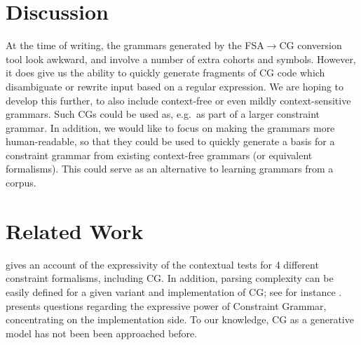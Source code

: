 \documentclass[11pt]{article}
\begin{document}
\section{Discussion}
At the time of writing, the grammars generated by the FSA$\rightarrow$CG
conversion tool look awkward, and involve a number of extra cohorts and symbols.
However, it does give us the ability to quickly generate fragments of CG code
which disambiguate or rewrite input based on a regular expression.
We are hoping to develop this further, to also include context-free or even
mildly context-sensitive grammars.
Such CGs could be used as, e.g.\ as part of a larger constraint grammar.
In addition, we would like to focus on making the grammars more human-readable,
so that they could be used to quickly generate a basis for a constraint grammar
from existing context-free grammars (or equivalent formalisms).
This could serve as an alternative to learning grammars from a corpus.


\section{Related Work}
 gives an account of the expressivity of
the contextual tests for 4 different constraint formalisms, including CG. 
In addition, parsing complexity can be easily defined for a given variant and 
implementation of CG; see for instance .
 presents questions regarding the expressive power
of Constraint Grammar, concentrating on the implementation side.
To our knowledge, CG as a generative model has not been been approached before.

\clearpage


\end{document}
